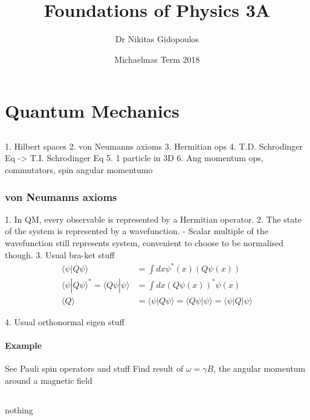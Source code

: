 \documentclass[a4paper, 11pt, normalem]{report}
\title{Foundations of Physics 3A \vspace{-20pt}}
\author{Dr Nikitas Gidopoulos}
\date{\vspace{-15pt}Michaelmas Term 2018}
\begin{document}
\maketitle
\tableofcontents

\part{Quantum Mechanics}
\chapter{}

1. Hilbert spaces
2. von Neumanns axioms
3. Hermitian ops
4. T.D. Schrodinger Eq -> T.I. Schrodinger Eq
5. 1 particle in 3D
6. Ang momentum ops, commutators, spin angular momentumo

\section{von Neumanns axioms}

1. In QM, every observable is represented by a Hermitian operator.
2. The state of the system is represented by a wavefunction.
    - Scalar multiple of the wavefunction still represents system, convenient to choose to be normalised though.
3. Usual bra-ket stuff
\begin{align}
    \langle\psi|Q\psi\rangle &= \int dx \psi^{*}(x)\left(Q\psi(x)\right) \\
    \langle\psi|Q\psi\rangle^{*} = \langle Q\psi|\psi\rangle &= \int dx \left(Q\psi(x)\right)^{*}\psi(x) \\
    \langle Q\rangle &= \langle\psi|Q\psi\rangle = \langle Q\psi|\psi\rangle = \langle\psi|Q|\psi\rangle
\end{align}

4. Usual orthonormal eigen stuff

\subsection{Example}

See Pauli spin operators and stuff
Find result of $\omega = \gamma B$, the angular momentum around a magnetic field

\chapter{}

nothing

\chapter{}
\end{document}
